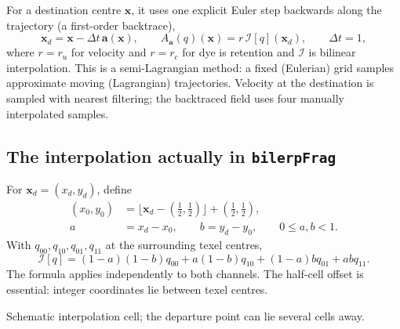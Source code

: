 \documentclass[11pt,a4paper]{article}
\newcommand{\xvec}{\mathbf{x}}
\begin{document}
For a destination centre $\xvec$, it uses one explicit Euler step backwards
along the trajectory (a first-order backtrace),
\begin{equation}
 \xvec_d=\xvec-\Delta t\,\mathbf a(\xvec),\qquad
 A_{\mathbf a}(q)(\xvec)=r\,\mathcal I[q](\xvec_d),\qquad\Delta t=1,
 \label{eq:advect}
\end{equation}
where $r=r_u$ for velocity and $r=r_c$ for dye is retention and $\mathcal I$ is bilinear interpolation. This is a
semi-Lagrangian method: a fixed (Eulerian) grid samples approximate moving
(Lagrangian) trajectories. Velocity at the destination is sampled with nearest
filtering; the backtraced field uses four manually interpolated samples.

\subsection*{The interpolation actually in \texttt{bilerpFrag}}
For $\xvec_d=(x_d,y_d)$, define
\begin{align}
 (x_0,y_0)&=\lfloor\xvec_d-(\tfrac12,\tfrac12)\rfloor+(\tfrac12,\tfrac12),\\
 a&=x_d-x_0,\qquad b=y_d-y_0,\qquad 0\leq a,b<1.
\end{align}
With $q_{00},q_{10},q_{01},q_{11}$ at the surrounding texel centres,
\begin{equation}
 \mathcal I[q]=(1-a)(1-b)q_{00}+a(1-b)q_{10}
 +(1-a)bq_{01}+abq_{11}.\label{eq:bilerp}
\end{equation}
The formula applies independently to both channels. The half-cell offset is
essential: integer coordinates lie between texel centres.

\begin{center}
\par
{\footnotesize Schematic interpolation cell; the departure point can lie several cells away.}
\end{center}
\end{document}

